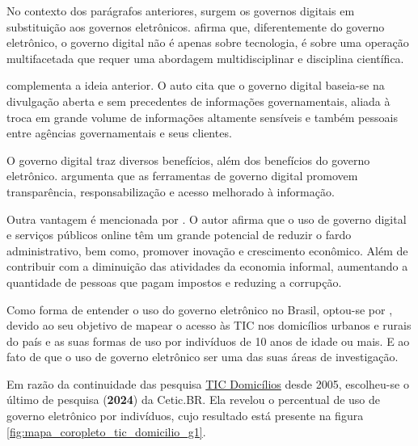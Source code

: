 No contexto dos parágrafos anteriores, surgem os governos digitais em substituição aos governos eletrônicos. \cite{veiga2016digital} afirma que, diferentemente do governo eletrônico, o governo digital não é apenas sobre tecnologia, é sobre uma operação multifacetada  que requer uma abordagem multidisciplinar e disciplina científica. 

\cite{bounabat2017government} complementa a ideia anterior. O auto cita que o governo digital baseia-se na divulgação aberta e sem precedentes de informações governamentais, aliada à troca em grande volume de informações altamente sensíveis e também pessoais entre agências governamentais e seus clientes. 

O governo digital traz diversos benefícios, além dos benefícios do governo eletrônico. \cite{martins2018war} argumenta que as ferramentas de governo digital promovem transparência, responsabilização e acesso melhorado à informação.

Outra vantagem é mencionada por \cite{veiga2016digital}. O autor afirma que o uso de governo digital e serviços públicos online têm um grande potencial de reduzir o fardo administrativo, bem como, promover inovação e crescimento econômico. Além de contribuir com a diminuição das atividades da economia informal, aumentando a quantidade de pessoas que pagam impostos e reduzing a corrupção.

Como forma de entender o uso do governo eletrônico no Brasil, optou-se por \cite{tic_domicilios_2024}, devido ao seu objetivo de mapear o acesso às TIC nos domicílios urbanos e rurais do país e as suas formas de uso por indivíduos de 10 anos de idade ou mais. E ao fato de que o uso de governo eletrônico ser uma das suas áreas de investigação.

Em razão da continuidade das pesquisa \href{https://cetic.br/pt/pesquisa/domicilios/}{TIC Domicílios} desde 2005, escolheu-se o último de pesquisa (\textbf{2024}) da Cetic.BR. Ela revelou o percentual de uso de governo eletrônico por indivíduos, cujo resultado está presente na figura \ref{fig:mapa_coropleto_tic_domicilio_g1}.


